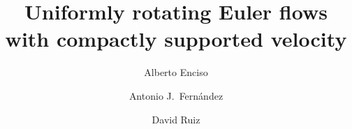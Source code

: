 \documentclass[11pt,oneside]{amsart}
\theoremstyle{definition}
\numberwithin{equation}{section}
\begin{document}
 
\title[Uniformly rotating Euler flows with compact support]{Uniformly rotating Euler flows\\ with compactly supported velocity}


\author[A. Enciso]{Alberto Enciso}
\address{   
\newline
\textbf{{\small Alberto Enciso}} 
\vspace{0.15cm}
\newline \indent Instituto de Ciencias Matem\'aticas, Consejo Superior de Investigaciones Cient\'\i ficas, 28049 \newline \indent Madrid,
 Spain}



 \author[A. J. Fern\'andez]{Antonio J.\ Fern\'andez}
 \address{ \vspace{-0.4cm}
\newline 
\textbf{{\small Antonio J. Fern\'andez}} 
\vspace{0.15cm}
\newline \indent Departamento de Matem\'aticas, Universidad Aut\'onoma de Madrid, 28049 Madrid, Spain}
 

 \author[D. Ruiz]{David Ruiz}
 \address{ \vspace{-0.4cm}
\newline 
\textbf{{\small David Ruiz}} 
\vspace{0.15cm}
\newline \indent  
 IMAG, Departamento de An\'alisis Matem\'atico, Universidad de Granada, 18071 Granada, \newline \indent Spain}
 
 


\end{document}
